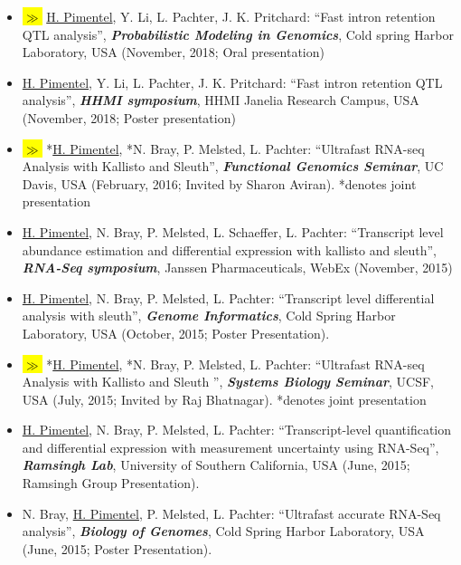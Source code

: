 \documentclass[11pt,notitlepage]{article} %
\newcommand{\hlc}[2][blue]{ {\sethlcolor{#1} \hl{#2}} }
\newcommand{\hlpub}{\hlc[Dandelion]{{\color{white}$\gg$} }}
\begin{document}
\begin{itemize}
\item \hlpub \underline{H. Pimentel}, Y. Li, L. Pachter, J. K. Pritchard: ``Fast intron retention QTL analysis'', {\bf \emph{Probabilistic Modeling in Genomics}}, Cold spring Harbor Laboratory, USA (November, 2018; Oral presentation)

\item \underline{H. Pimentel}, Y. Li, L. Pachter, J. K. Pritchard: ``Fast intron retention QTL analysis'', {\bf \emph{HHMI symposium}}, HHMI Janelia Research Campus, USA (November, 2018; Poster presentation)

\item \hlpub *\underline{H. Pimentel}, *N. Bray, P. Melsted, L. Pachter: ``Ultrafast RNA-seq Analysis with Kallisto and Sleuth'', {\bf \emph{Functional Genomics Seminar}}, UC Davis, USA (February, 2016; Invited by Sharon Aviran). *denotes joint presentation

\item \underline{H. Pimentel}, N. Bray, P. Melsted, L. Schaeffer, L. Pachter: ``Transcript level abundance estimation and differential expression with kallisto and sleuth'', {\bf \emph{RNA-Seq symposium}}, Janssen Pharmaceuticals, WebEx (November, 2015)

\item \underline{H. Pimentel}, N. Bray, P. Melsted, L. Pachter: ``Transcript level differential analysis with sleuth'', {\bf \emph{Genome Informatics}}, Cold Spring Harbor
Laboratory, USA (October, 2015; Poster Presentation).

\item \hlpub *\underline{H. Pimentel}, *N. Bray, P. Melsted, L. Pachter: ``Ultrafast RNA-seq Analysis with Kallisto and Sleuth '', {\bf \emph{Systems Biology Seminar}}, UCSF, USA (July, 2015; Invited by Raj Bhatnagar). *denotes joint presentation

\item \underline{H. Pimentel}, N. Bray, P. Melsted, L. Pachter: ``Transcript-level
quantification and differential expression with measurement uncertainty using
RNA-Seq'', {\bf \emph{Ramsingh Lab}}, University of Southern California, USA (June,
2015; Ramsingh Group Presentation).

\item N. Bray, \underline{H. Pimentel}, P. Melsted, L. Pachter: ``Ultrafast accurate
RNA-Seq analysis'', {\bf \emph{Biology of Genomes}}, Cold Spring Harbor
Laboratory, USA (June, 2015; Poster Presentation).


\end{itemize}
\end{document}
